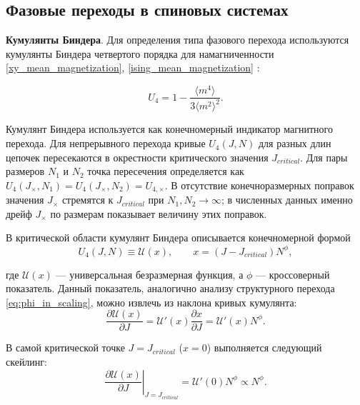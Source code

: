   
 \subsection{Фазовые переходы в спиновых системах} 
 
 \newcommand{\nuSAW}{\nu_{\mathrm{SAW}}}
 \newcommand{\nuSpin}{\nu_{\mathrm{spin}}}
 \newcommand{\nuEff}{\nu_{\mathrm{eff}}}
 
 
  
 \textbf{Кумулянты Биндера}. 
Для определения типа фазового перехода используются кумулянты Биндера четвертого порядка для намагниченности \eqref{xy_mean_magnetization},  \eqref{ising_mean_magnetization} \cite{PhysRevLett.47.693}: 


  \begin{equation}
 	\label{binder_cumulant}
  U_4 = 1 - \frac{ 	\langle m^4 \rangle  }{ 3 	\langle m^2 \rangle ^2 }. 
 \end{equation}
 
Кумулянт Биндера используется как конечномерный индикатор магнитного перехода. 
Для непрерывного перехода кривые $U_4(J,N)$ для разных длин цепочек пересекаются в окрестности критического значения $J_{critical}$. 
Для пары размеров $N_1$ и $N_2$ точка пересечения определяется как $U_4(J_\times,N_1) =	U_4(J_\times,N_2) = 	U_{4,\times} $.
В отсутствие конечноразмерных поправок значения $J_\times$ стремятся к $J_{critical}$ при $N_1,N_2\to\infty$; в численных данных именно дрейф $J_\times$ по размерам показывает величину этих поправок.

В критической области кумулянт Биндера описывается конечномерной формой
%
\begin{equation}
	\label{binder_scaling_phi}
	U_4(J,N)  \equiv   \mathcal U(x),  \qquad
	x=(J-J_{critical})N^\phi,
\end{equation} 

где $\mathcal U(x)$ --- универсальная безразмерная функция, а $\phi$ --- кроссоверный показатель. Данный показатель, аналогично анализу структурного перехода \eqref{eq:phi_in_scaling}, можно извлечь из наклона кривых кумулянта:
 \begin{equation}
	\label{binder_derivative_scaling_phi}
    \frac{\partial \mathcal U(x)}{\partial J}
=
\mathcal U'(x)\frac{\partial x}{\partial J}
=
\mathcal U'(x)N^\phi.
\end{equation}

В самой критической точке $J=J_{critical}$ ($x=0$) выполняется следующий скейлинг:
\begin{equation}
	\left.
	\frac{\partial  \mathcal U(x) }{\partial J}
	\right|_{J=J_{critical}}
	=
	\mathcal U'(0)N^\phi
	\propto
	N^\phi.
\end{equation} 

